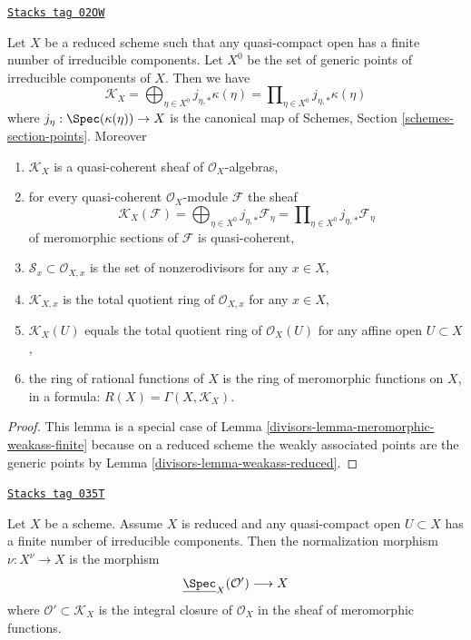 \begin{lemma}
\label{divisors-lemma-reduced-finite-irreducible}
\href{https://stacks.math.columbia.edu/tag/02OW}{\texttt{Stacks tag 02OW}}

Let $X$ be a reduced scheme such that any quasi-compact open
has a finite number of irreducible components. Let $X^0$ be the set
of generic points of irreducible components of $X$. Then we have
$$
\mathcal{K}_X =
\bigoplus\nolimits_{\eta \in X^0} j_{\eta, *}\kappa(\eta) =
\prod\nolimits_{\eta \in X^0} j_{\eta, *}\kappa(\eta)
$$
where $j_\eta : \Spec(\kappa(\eta)) \to X$ is the canonical map
of Schemes, Section \ref{schemes-section-points}. Moreover
\begin{enumerate}
\item $\mathcal{K}_X$ is a quasi-coherent sheaf of
$\mathcal{O}_X$-algebras,
\item for every quasi-coherent $\mathcal{O}_X$-module $\mathcal{F}$ the sheaf
$$
\mathcal{K}_X(\mathcal{F}) =
\bigoplus\nolimits_{\eta \in X^0} j_{\eta, *}\mathcal{F}_\eta =
\prod\nolimits_{\eta \in X^0} j_{\eta, *}\mathcal{F}_\eta
$$
of meromorphic sections of $\mathcal{F}$
is quasi-coherent,
\item $\mathcal{S}_x \subset \mathcal{O}_{X, x}$
is the set of nonzerodivisors for any $x \in X$,
\item $\mathcal{K}_{X, x}$ is the total quotient ring of $\mathcal{O}_{X, x}$
for any $x \in X$,
\item $\mathcal{K}_X(U)$ equals the total quotient ring of $\mathcal{O}_X(U)$
for any affine open $U \subset X$,
\item the ring of rational functions of $X$ is the ring of meromorphic
functions on $X$, in a formula: $R(X) = \Gamma(X, \mathcal{K}_X)$.
\end{enumerate}
\end{lemma}

\begin{proof}

This lemma is a special case of
Lemma \ref{divisors-lemma-meromorphic-weakass-finite}
because on a reduced scheme the weakly associated
points are the generic points by
Lemma \ref{divisors-lemma-weakass-reduced}.
\end{proof}

\begin{lemma}
\label{divisors-lemma-reduced-normalization}
\href{https://stacks.math.columbia.edu/tag/035T}{\texttt{Stacks tag 035T}}

Let $X$ be a scheme.
Assume $X$ is reduced and any quasi-compact open $U \subset X$
has a finite number of irreducible components.
Then the normalization morphism $\nu : X^\nu \to X$ is the
morphism
$$
\underline{\Spec}_X(\mathcal{O}') \longrightarrow X
$$
where $\mathcal{O}' \subset \mathcal{K}_X$ is the integral
closure of $\mathcal{O}_X$ in the sheaf of meromorphic functions.
\end{lemma}


